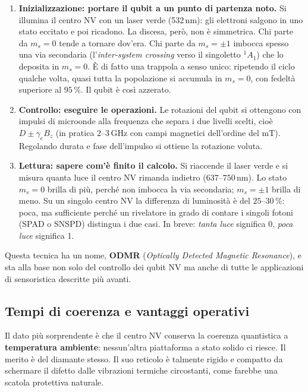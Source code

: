 \begin{enumerate}
  \item \textbf{Inizializzazione: portare il qubit a un punto di partenza noto.}
    Si illumina il centro NV con un laser verde (532\,nm): gli elettroni salgono
    in uno stato eccitato e poi ricadono. La discesa, però, non è simmetrica.
    Chi parte da $m_s = 0$ tende a tornare dov'era. Chi parte da $m_s = \pm 1$
    imbocca spesso una via secondaria (l'\textit{inter-system crossing} verso il
    singoletto $^1A_1$) che lo deposita in $m_s = 0$. È di fatto una trappola a
    senso unico: ripetendo il ciclo qualche volta, quasi tutta la popolazione si
    accumula in $m_s = 0$, con fedeltà superiore al $95\,\%$. Il qubit è così
    azzerato.

  \item \textbf{Controllo: eseguire le operazioni.} Le rotazioni del qubit si
    ottengono con impulsi di microonde alla frequenza che separa i due livelli
    scelti, cioè $D \pm \gamma_e B_z$ (in pratica $2$--$3\,\text{GHz}$ con campi
    magnetici dell'ordine del mT). Regolando durata e fase dell'impulso si
    ottiene la rotazione voluta.

  \item \textbf{Lettura: sapere com'è finito il calcolo.} Si riaccende il laser
    verde e si misura quanta luce il centro NV rimanda indietro
    ($637$--$750\,\text{nm}$). Lo stato $m_s = 0$ brilla di più, perché non
    imbocca la via secondaria; $m_s = \pm 1$ brilla di meno. Su un singolo
    centro NV la differenza di luminosità è del $25$--$30\,\%$: poca, ma
    sufficiente perché un rivelatore in grado di contare i singoli fotoni (SPAD
    o SNSPD) distingua i due casi. In breve: \textit{tanta luce} significa 0,
    \textit{poca luce} significa 1.
\end{enumerate}

Questa tecnica ha un nome, \textbf{ODMR} (\textit{Optically Detected Magnetic
Resonance}), e sta alla base non solo del controllo dei qubit NV ma anche di
tutte le applicazioni di sensoristica descritte più avanti.

\subsection{Tempi di coerenza e vantaggi operativi}
\label{subsec:nv-coerenza}

Il dato più sorprendente è che il centro NV conserva la coerenza quantistica a
\textbf{temperatura ambiente}: nessun'altra piattaforma a stato solido ci
riesce. Il merito è del diamante stesso. Il suo reticolo è talmente rigido e
compatto da schermare il difetto dalle vibrazioni termiche circostanti, come
farebbe una scatola protettiva naturale.

